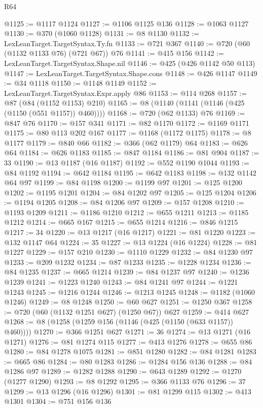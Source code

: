 \begin{lexlean}{R64}
\begin{coremodule}
@1125 := @1117 @1124
@1127 := @1106 @1125 @136
@1128 := @1063 @1127
@1130 := @370 (@1060 @1128)
@1131 := @8 @1130
@1132 := LexLeanTarget.TargetSyntax.Ty.fn
@1133 := @721 @367
@1140 := @720 (@60 (@1132 @1133 @76) (@721 @67)) @76
@1141 := @415 @156
@1142 := LexLeanTarget.TargetSyntax.Shape.nil
@1146 := @425 (@426 @1142 @50 @113)
@1147 := LexLeanTarget.TargetSyntax.Shape.cons
@1148 := @426 @1147
@1149 := @34 @1118
@1150 := @1148 @1149
@1152 := LexLeanTarget.TargetSyntax.Expr.apply @86
@1153 := @114 @268
@1157 := @87 (@84 (@1152 @1153) @210)
@1165 := @8 (@1140 (@1141 (@1146 (@425 (@1150 (@551 @1157)) @460))))
@1168 := @720 (@62 @1133) @76
@1169 := @847 @76
@1170 := @157 @341
@1171 := @82 @1170
@1172 := @1169 @1171
@1175 := @80 @113 @202 @167
@1177 := @1168 (@1172 @1175)
@1178 := @8 @1177
@1179 := @840 @66
@1182 := @366 (@62 @1179) @64
@1183 := @626 @64
@1184 := @626 @1183
@1185 := @847 @1184
@1186 := @81 @904
@1187 := 33
@1190 := @13 @1187 (@16 @1187)
@1192 := @552 @1190 @1044
@1193 := @84 @1192
@1194 := @642 @1184
@1195 := @642 @1183
@1198 := @132 @1142 @64 @97
@1199 := @84 @1198
@1200 := @1199 @97
@1201 := @125 @1200
@1202 := @1195 @1201
@1204 := @84 @1202 @97
@1205 := @125 @1204
@1206 := @1194 @1205
@1208 := @84 @1206 @97
@1209 := @157 @1208
@1210 := @1193 @1209
@1211 := @1186 @1210
@1212 := @655 @1211
@1213 := @1185 @1212
@1214 := @665 @167
@1215 := @655 @1214
@1216 := @846 @1215
@1217 := 34
@1220 := @13 @1217 (@16 @1217)
@1221 := @81 @1220
@1223 := @132 @1147 @64
@1224 := 35
@1227 := @13 @1224 (@16 @1224)
@1228 := @81 @1227
@1229 := @157 @210
@1230 := @1110 @1229
@1232 := @84 @1230 @97
@1233 := @209 @1232
@1234 := @87 @1233
@1235 := @1228 @1234
@1236 := @84 @1235
@1237 := @665 @1214
@1239 := @84 @1237 @97
@1240 := @1236 @1239
@1241 := @1223 @1240
@1243 := @84 @1241 @97
@1244 := @1221 @1243
@1245 := @1216 @1244
@1246 := @1213 @1245
@1248 := @1182 (@1060 @1246)
@1249 := @8 @1248
@1250 := @60 @627
@1251 := @1250 @367
@1258 := @720 (@60 (@1132 @1251 @627) (@1250 @67)) @627
@1259 := @414 @627
@1268 := @8 (@1258 (@1259 @156 (@1146 (@425 (@1150 (@633 @1157)) @460))))
@1270 := @366 @1251 @627
@1271 := 36
@1274 := @13 @1271 (@16 @1271)
@1276 := @81 @1274 @115
@1277 := @413 @1276
@1278 := @655 @86
@1280 := @84 @1278 @1075
@1281 := @851 @1280
@1282 := @84 @1281
@1283 := @665 @86
@1284 := @80 @1283
@1286 := @1284 @156 @136
@1288 := @84 @1286 @97
@1289 := @1282 @1288
@1290 := @643 @1289
@1292 := @1270 (@1277 @1290)
@1293 := @8 @1292
@1295 := @366 @1133 @76
@1296 := 37
@1299 := @13 @1296 (@16 @1296)
@1301 := @81 @1299 @115
@1302 := @413 @1301
@1304 := @751 @156 @136

\end{coremodule}
\end{lexlean}
